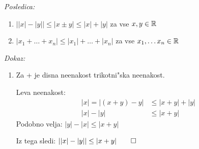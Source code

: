 \emph{Posledica:}
\begin{enumerate}[1)]
	\item $ \left||x| - |y|\right| \leq |x \pm y| \leq |x| + |y|$ za vse $x, y \in \mathbb{R}$
	\item $|x_1 + \ldots + x_n| \leq |x_1| + \ldots + |x_n|$ za vse $x_1, \ldots x_n \in \mathbb{R}$
\end{enumerate}
\emph{Dokaz:}
\begin{enumerate}[1)]
	\item Za + je disna neenakost trikotni"ska neenakost.
	
	Leva neenakost:
	\begin{align*}
	|x| = |(x + y) - y| &\leq |x + y| + |y|\\
	|x| - |y| &\leq |x + y|
	\end{align*}
	Podobno velja: $|y| - |x| \leq |x + y|$
	
	Iz tega sledi: $||x| - |y|| \leq |x + y| \qed$
\end{enumerate}